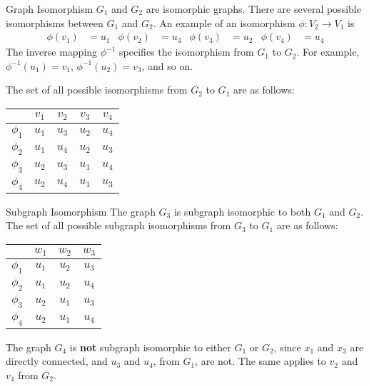 \begin{frame}{Graph Isomorphism}
$G_1$
and $G_2$ are isomorphic graphs. There are several possible
isomorphisms between $G_1$ and $G_2$. An example of
an isomorphism $\phi: V_2 \to V_1$ is
\begin{align*}
  \phi(v_1) & = u_1 & \phi(v_2) &= u_3 & \phi(v_3) & = u_2 &
  \phi(v_4) & = u_4
\end{align*}
The inverse mapping $\phi^{-1}$ specif\/{i}es the isomorphism from $G_1$
to $G_2$. For example, $\phi^{-1}(u_1) = v_1$,
$\phi^{-1}(u_2) = v_3$, and so on.

\bigskip
The set of all possible isomorphisms from $G_2$ to $G_1$ are as
follows:
\begin{center}
\begin{tabular}{c|cccc}
  & $v_1$ & $v_2$ & $v_3$ & $v_4$\\
  \hline
  $\phi_1$ & $u_1$ & $u_3$ & $u_2$ & $u_4$\\
  $\phi_2$ & $u_1$ & $u_4$ & $u_2$ & $u_3$\\
  $\phi_3$ & $u_2$ & $u_3$ & $u_1$ & $u_4$\\
  $\phi_4$ & $u_2$ & $u_4$ & $u_1$ & $u_3$
\end{tabular}
\end{center}
\end{frame}

\begin{frame}{Subgraph Isomorphism}
The graph $G_3$ is subgraph isomorphic to
both $G_1$ and $G_2$. The set of all possible subgraph
isomorphisms from $G_3$ to $G_1$ are as follows:
\begin{center}
\begin{tabular}{c|ccc}
  & $w_1$ & $w_2$ & $w_3$\\
  \hline
  $\phi_1$ & $u_1$ & $u_2$ & $u_3$\\
  $\phi_2$ & $u_1$ & $u_2$ & $u_4$\\
  $\phi_3$ & $u_2$ & $u_1$ & $u_3$\\
  $\phi_4$ & $u_2$ & $u_1$ & $u_4$\\
\end{tabular}
\end{center}

\medskip

The graph $G_4$ is \textbf{not} subgraph isomorphic to
either $G_1$ or $G_2$, since $x_1$ and $x_3$ are directly connected, and 
$u_3$ and $u_4$, from $G_1$, are not. The same applies to $v_2$ and $v_4$ 
from $G_2$. 

\end{frame}

